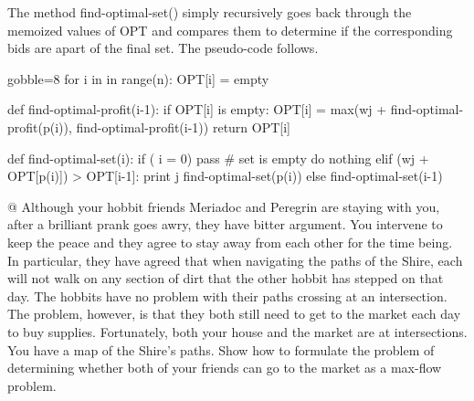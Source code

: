\documentclass[10pt]{article}\usepackage[]{graphicx}\usepackage[]{xcolor}
\begin{document}
\begin{easylist}[enumerate]
    The method {\ttfamily find-optimal-set()} simply recursively goes back through the memoized values of {\ttfamily
    OPT} and compares them to determine if the corresponding bids are apart of the final set. The pseudo-code follows.

    \begin{pythoncode*}{gobble=8}
        for i in in range(n):
            OPT[i] = empty

        def find-optimal-profit(i-1):
            if OPT[i] is empty:
                OPT[i] = max(wj + find-optimal-profit(p(i)),
                                find-optimal-profit(i-1))
            return OPT[i]

        def find-optimal-set(i):
            if ( i = 0)
                pass  # set is empty do nothing
            elif (wj + OPT[p(i)]) > OPT[i-1]:
                print j
                find-optimal-set(p(i))
            else
                find-optimal-set(i-1)
    \end{pythoncode*}

    @ Although your hobbit friends Meriadoc and Peregrin are staying with you, after a brilliant prank goes awry, they
    have bitter argument. You intervene to keep the peace and they agree to stay away from each other for the time
    being. In particular, they have agreed that when navigating the paths of the Shire, each will not walk on any
    section of dirt that the other hobbit has stepped on that day. The hobbits have no problem with their paths crossing
    at an intersection. The problem, however, is that they both still need to get to the market each day to buy
    supplies.  Fortunately, both your house and the market are at intersections. You have a map of the Shire's paths.
    Show how to formulate the problem of determining whether both of your friends can go to the market as a max-flow
    problem.


\end{easylist}
\end{document}
